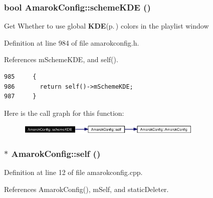 \subsubsection{\setlength{\rightskip}{0pt plus 5cm}bool Amarok\-Config::scheme\-KDE ()\hspace{0.3cm}{\tt  [inline, static]}}\label{classAmarokConfig_AmarokConfige102}


Get Whether to use global {\bf KDE}{\rm (p.\,\pageref{namespaceKDE})} colors in the playlist window 

Definition at line 984 of file amarokconfig.h.

References m\-Scheme\-KDE, and self().



\footnotesize\begin{verbatim}985     {
986       return self()->mSchemeKDE;
987     }
\end{verbatim}\normalsize 


Here is the call graph for this function:\begin{figure}[H]
\begin{center}
\leavevmode
\includegraphics[width=251pt]{classAmarokConfig_AmarokConfige102_cgraph}
\end{center}
\end{figure}
\subsubsection{ $\ast$ Amarok\-Config::self ()\hspace{0.3cm}{\tt  [static]}}\label{classAmarokConfig_AmarokConfige0}




Definition at line 12 of file amarokconfig.cpp.

References Amarok\-Config(), m\-Self, and static\-Deleter.

